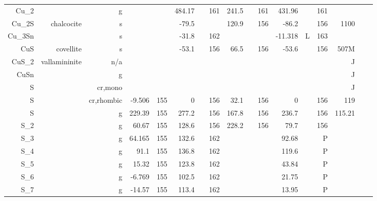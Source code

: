 \begin{table}[htbp]
\begin{adjustbox}{width=1\textwidth}
\begin{tabular}{rrrrrrrrrrrrrrrrr}
    Cu\_2 &       & g     &       &       & 484.17 &       & 161   & 241.5 &       & 161   & 431.96 &       & 161   &       &       &  \\
    Cu\_2S & chalcocite & s     &       &       & -79.5 &       &       & 120.9 &       & 156   & -86.2 &       & 156   & 1100  &       &  \\
    Cu\_3Sn &       & s     &       &       & -31.8 &       & 162   &       &       &       & -11.318 & L     & 163   &       &       &  \\
    CuS   & covellite & s     &       &       & -53.1 &       & 156   & 66.5  &       & 156   & -53.6 &       & 156   & 507M  &       &  \\
    CuS\_2 & vallamininite & n/a   &       &       &       &       &       &       &       &       &       &       &       & J     &       &  \\
    CuSn  &       & g     &       &       &       &       &       &       &       &       &       &       &       & J     &       &  \\
    S     &       & cr,mono &       &       &       &       &       &       &       &       &       &       &       & J     &       &  \\
    S     &       & cr,rhombic & -9.506 & 155   & 0     &       & 156   & 32.1  &       & 156   & 0     &       & 156   & 119   &       &  \\
    S     &       & g     & 229.39 & 155   & 277.2 &       & 156   & 167.8 &       & 156   & 236.7 &       & 156   & 115.21 &       &  \\
    S\_2  &       & g     & 60.67 & 155   & 128.6 &       & 156   & 228.2 &       & 156   & 79.7  &       & 156   &       &       &  \\
    S\_3  &       & g     & 64.165 & 155   & 132.6 &       & 162   &       &       &       & 92.68 &       & P     &       &       &  \\
    S\_4  &       & g     & 91.1  & 155   & 136.8 &       & 162   &       &       &       & 119.6 &       & P     &       &       &  \\
    S\_5  &       & g     & 15.32 & 155   & 123.8 &       & 162   &       &       &       & 43.84 &       & P     &       &       &  \\
    S\_6  &       & g     & -6.769 & 155   & 102.5 &       & 162   &       &       &       & 21.75 &       & P     &       &       &  \\
    S\_7  &       & g     & -14.57 & 155   & 113.4 &       & 162   &       &       &       & 13.95 &       & P     &       &       &  \\

\end{tabular}
\end{adjustbox}
\end{table}

